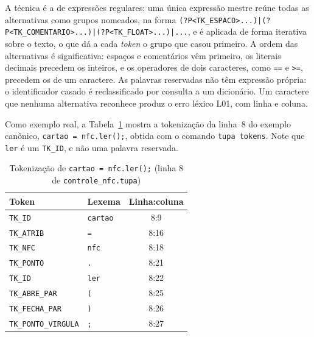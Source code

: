 \documentclass[conference]{IEEEtran}
\begin{document}
A técnica é a de expressões regulares: uma única expressão mestre reúne todas
as alternativas como grupos nomeados, na forma
\texttt{(?P<TK\_ESPACO>...)\allowbreak|\allowbreak(?P<TK\_COMENTARIO>...)\allowbreak|\allowbreak(?P<TK\_FLOAT>...)\allowbreak|...},
e é aplicada de forma iterativa sobre o texto, o que dá a cada \textit{token}
o grupo que casou primeiro. A ordem das alternativas é significativa: espaços
e comentários vêm primeiro, os literais decimais precedem os inteiros, e os
operadores de dois caracteres, como \texttt{==} e \texttt{>=}, precedem os de
um caractere. As palavras reservadas não têm expressão própria: o
identificador casado é reclassificado por consulta a um dicionário. Um
caractere que nenhuma alternativa reconhece produz o erro léxico L01, com
linha e coluna.

Como exemplo real, a Tabela~\ref{tab:tokenizacao} mostra a tokenização da
linha~8 do exemplo canônico, \texttt{cartao = nfc.ler();}, obtida com o
comando \texttt{tupa tokens}. Note que \texttt{ler} é um \texttt{TK\_ID}, e
não uma palavra reservada.

\begin{table}[htbp]
\caption{Tokenização de \texttt{cartao = nfc.ler();} (linha 8 de \texttt{controle\_nfc.tupa})}
\begin{center}
\footnotesize
\begin{tabular}{llc}
\toprule
\textbf{Token} & \textbf{Lexema} & \textbf{Linha:coluna} \\
\midrule
\texttt{TK\_ID} & \texttt{cartao} & 8:9 \\
\texttt{TK\_ATRIB} & \texttt{=} & 8:16 \\
\texttt{TK\_NFC} & \texttt{nfc} & 8:18 \\
\texttt{TK\_PONTO} & \texttt{.} & 8:21 \\
\texttt{TK\_ID} & \texttt{ler} & 8:22 \\
\texttt{TK\_ABRE\_PAR} & \texttt{(} & 8:25 \\
\texttt{TK\_FECHA\_PAR} & \texttt{)} & 8:26 \\
\texttt{TK\_PONTO\_VIRGULA} & \texttt{;} & 8:27 \\
\bottomrule
\end{tabular}
\label{tab:tokenizacao}
\end{center}
\end{table}
\end{document}
